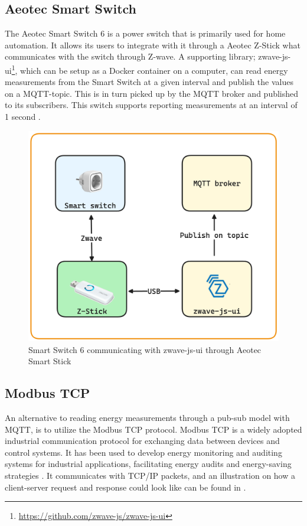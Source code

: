 \documentclass[
  table]{report}
\begin{document}
\subsection{Aeotec Smart Switch}

The Aeotec Smart Switch 6 is a power switch that is primarily used for
home automation. It allows its users to integrate with it through a
Aeotec Z-Stick what communicates with the switch through Z-wave. A
supporting library; zwave-js-ui\footnote{\url{https://github.com/zwave-js/zwave-js-ui}},
which can be setup as a Docker container on a computer, can read energy
measurements from the Smart Switch at a given interval and publish the
values on a \ac{MQTT}-topic. This is in turn picked up by the \ac{MQTT}
broker and published to its subscribers. This switch supports reporting
measurements at an interval of 1 second \citep{aeotecAeotecSmartSwitch}.

\begin{figure}[H]
\centering
  \includegraphics[width=0.7\columnwidth]{assets/3-smart-switch.png}
  \caption{Smart Switch 6 communicating with zwave-js-ui through Aeotec Smart Stick }
  \label{fig:modbus-tcp-gude}
\end{figure}

\subsection{Modbus TCP}

An alternative to reading energy measurements through a pub-sub model
with \ac{MQTT}, is to utilize the Modbus TCP protocol. Modbus TCP is a
widely adopted industrial communication protocol for exchanging data
between devices and control systems. It has been used to develop energy
monitoring and auditing systems for industrial applications,
facilitating energy audits and energy-saving strategies
\citep{tongStudyEthernetCommunication2015}. It communicates with TCP/IP
packets, and an illustration on how a client-server request and response
could look like can be found in .
\end{document}
